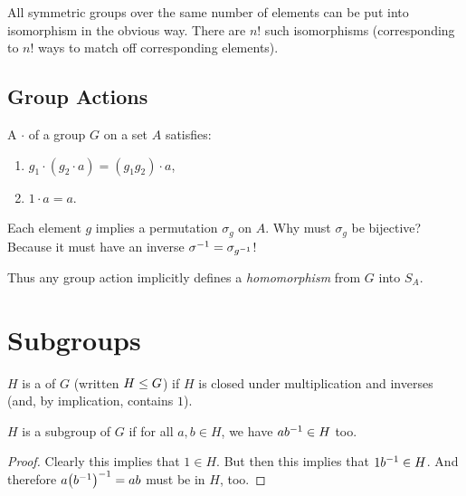 \documentclass[11pt, oneside]{amsart}
\begin{document}
\begin{remark}
  All symmetric groups over the same number of elements can be put into
  isomorphism in the obvious way. There are $n!$ such isomorphisms
  (corresponding to $n!$ ways to match off corresponding elements).
\end{remark}

\subsection{Group Actions}

\begin{definition}
  A  $\cdot$ of a group $G$ on a set $A$ satisfies:

  \begin{enumerate}
    \item $g_1 \cdot (g_2 \cdot a) = (g_1 g_2) \cdot a$,
    \item $1 \cdot a = a$.
  \end{enumerate}
\end{definition}

\begin{remark}
  Each element $g$ implies a permutation $\sigma_g$ on $A$. Why must
  $\sigma_g$ be bijective? Because it must have an inverse
  ${\sigma}^{-1} = \sigma_{{g}^{-1}}$!

  Thus any group action implicitly defines a \emph{homomorphism} from
  $G$ into $S_A$.
\end{remark}

\section{Subgroups}

\begin{definition}
  $H$ is a  of $G$ (written $H \leq G$) if $H$ is
  closed under multiplication and inverses (and, by implication,
  contains $1$).
\end{definition}

\begin{proposition}
  $H$ is a subgroup of $G$ if for all $a, b \in H$, we have $a{b}^{-1}
  \in H$ too.
\end{proposition}

\begin{proof}
  Clearly this implies that $1 \in H$. But then this implies that $1
  {b}^{-1} \in H$. And therefore $a\mathopen{}\left( {{b}^{-1}} \right)^{-1}\mathclose{} = ab$ must be in
  $H$, too.
\end{proof}
\end{document}
